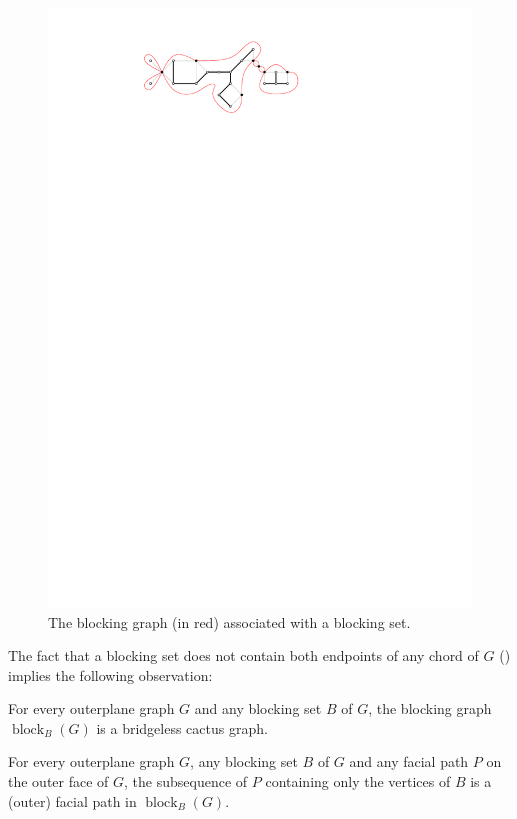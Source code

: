 \documentclass{patmorin}
\DeclareMathOperator{\block}{block}
\begin{document}
\begin{figure}
  \begin{center}
     \includegraphics{figs/blocking-set-2}
  \end{center}
  \caption{The blocking graph (in red) associated with a blocking set.}
\end{figure}

The fact that a blocking set does not contain both endpoints of any
chord of $G$ () implies the following observation:

\begin{obs}
   For every outerplane graph $G$ and any blocking set $B$ of $G$,
   the blocking graph $\block_B(G)$ is a bridgeless cactus graph.
\end{obs}


\begin{obs}
For every outerplane graph $G$, any blocking set $B$ of $G$ and any
facial path $P$ on the outer face of  $G$, the subsequence of $P$
containing only the vertices of $B$ is a (outer) facial path in $\block_B(G)$.
\end{obs}
\end{document}
